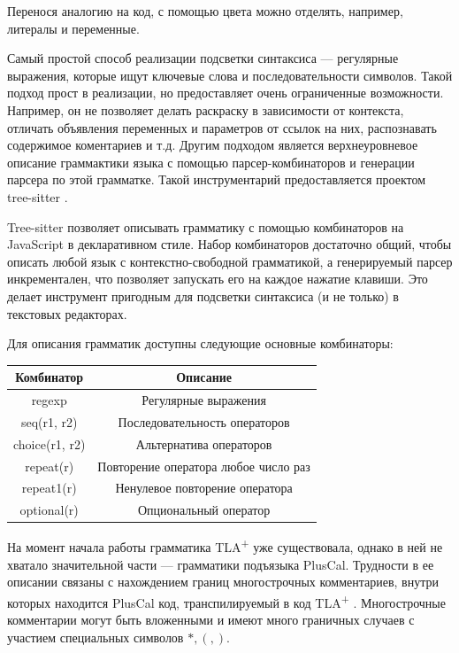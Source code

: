 \documentclass[14pt, openany]{report}
\newcommand{\tlapl}{TLA\textsuperscript{+} }
\begin{document}
Перенося аналогию на код, с помощью цвета можно отделять, например, литералы и переменные.

Самый простой способ реализации подсветки синтаксиса --- регулярные выражения, которые ищут ключевые слова и последовательности символов. Такой подход прост в реализации, но предоставляет очень ограниченные возможности. Например, он не позволяет делать раскраску в зависимости от контекста, отличать объявления переменных и параметров от ссылок на них, распознавать содержимое коментариев и т.д. Другим подходом является верхнеуровневое описание граммактики языка с помощью парсер-комбинаторов и генерации парсера по этой грамматке. Такой инструментарий предоставляется проектом tree-sitter \cite{treeSitter}. 

Tree-sitter позволяет описывать грамматику с помощью комбинаторов на JavaScript в декларативном стиле. Набор комбинаторов достаточно общий, чтобы описать любой язык с контекстно-свободной грамматикой, а генерируемый парсер инкрементален, что позволяет запускать его на каждое нажатие клавиши. Это делает инструмент пригодным для подсветки синтаксиса (и не только) в текстовых редакторах.

Для описания грамматик доступны следующие основные комбинаторы:
\begin{center}
\begin{tabular}{||c | c||} 
 \hline
Комбинатор & Описание \\ 
 \hline\hline
regexp & Регулярные выражения \\
 \hline
seq(r1, r2) & Последовательность операторов\\ 
 \hline
choice(r1, r2) & Альтернатива операторов \\
 \hline
repeat(r) & Повторение оператора любое число раз\\
 \hline
repeat1(r) & Ненулевое повторение оператора \\
 \hline
optional(r) & Опциональный оператор\\ 
 \hline
\end{tabular}
\end{center}


На момент начала работы грамматика \tlapl уже существовала, однако в ней не хватало значительной части --- грамматики подъязыка PlusCal. Трудности в ее описании связаны с нахождением границ многострочных комментариев, внутри которых находится PlusCal код, транспилируемый в код \tlapl. Многострочные комментарии могут быть вложенными и имеют много граничных случаев с участием специальных символов \(*, (, )\). 
\end{document}

